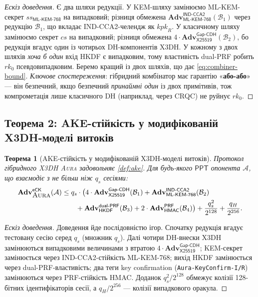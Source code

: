 \documentclass[11pt,a4paper]{article}
\newtheorem{theorem}{Теорема}[section]
\theoremstyle{definition}
\newcommand{\ppt}{\ensuremath{\mathsf{PPT}}}
\newcommand{\adv}{\ensuremath{\mathbf{Adv}}}
\newcommand{\advA}{\ensuremath{\mathcal{A}}}
\newcommand{\advB}{\ensuremath{\mathcal{B}}}
\newcommand{\HKDF}{\textsf{HKDF}}
\newcommand{\HMAC}{\textsf{HMAC}}
\renewcommand{\DH}{\textsf{X25519}}
\newcommand{\KEM}{\textsf{ML-KEM-768}}
\newcommand{\GapCDH}{\textsf{Gap-CDH}}
\newcommand{\INDCCA}{\textsf{IND-CCA2}}
\newcommand{\PRF}{\textsf{PRF}}
\newcommand{\dualPRF}{\textsf{dual-PRF}}
\newcommand{\eCK}{\textsf{eCK}}
\newcommand{\rk}{\ensuremath{\mathit{rk}}}
\newcommand{\Aura}{\mbox{\normalfont\scshape Aura}}
\begin{document}
\begin{proof}[Ескіз доведення]
Є два шляхи редукції. У KEM-шляху замінюємо ML-KEM-секрет
$\mathit{ss}_{\KEM}$ на випадковий; різниця обмежена
$\adv^{\INDCCA}_{\KEM}(\advB_1)$ через редукцію $\advB_1$, що вкладає
\INDCCA{}-челендж як $\mathit{kpk}_R$. У класичному шляху замінюємо
секрет $\mathit{cs}$ на випадковий; різниця обмежена
$4\cdot\adv^{\GapCDH}_{\DH}(\advB_2)$, бо редукція вгадує один із
чотирьох DH-компонентів X3DH. У кожному з двох шляхів \emph{хоча б
один} вхід HKDF є випадковим, тому властивість \dualPRF{} робить
$\rk_0$ псевдовипадковим. Беремо кращий із двох шляхів, що дає
\cref{eq:combiner-bound}. \emph{Ключове спостереження}: гібридний
комбінатор має гарантію «\textbf{або-або}» — він безпечний, якщо
безпечний \emph{принаймні один} із двох примітивів, тож компрометація
лише класичного DH (наприклад, через CRQC) не руйнує $\rk_0$.
\end{proof}

\subsection{Теорема 2: AKE-стійкість у модифікованій X3DH-моделі витоків}\label{sec:thm2}

\begin{theorem}[AKE-стійкість у модифікованій X3DH-моделі витоків]\label{thm:ake}
Протокол гібридного X3DH \Aura{} задовольняє \cref{def:ake}. Для будь-якого
\ppt{} опонента $\advA$, що взаємодіє з не більш ніж $q_s$ сесіями:
\begin{align}
  \adv^{\eCK}_{\Aura}(\advA)
  &\le
  q_s \cdot \big(
    4 \cdot \adv^{\GapCDH}_{\DH}(\advB_1)
    + \adv^{\INDCCA}_{\KEM}(\advB_2) \notag\\
  &\qquad
    + \adv^{\dualPRF}_{\HKDF}(\advB_3)
    + 2 \cdot \adv^{\PRF}_{\HMAC}(\advB_4)\big)
    + \frac{q_s^2}{2^{128}} + \frac{q_H}{2^{256}} .
  \label{eq:ake-bound}
\end{align}
\end{theorem}

\begin{proof}[Ескіз доведення]
Доведення йде послідовністю ігор. Спочатку редукція вгадує тестовану
сесію серед $q_s$ (множник $q_s$). Далі чотири DH-внески X3DH
замінюються випадковими величинами з втратою
$4\cdot\adv^{\GapCDH}_{\DH}$; KEM-секрет замінюється через
\INDCCA{}-стійкість \KEM{}; вихід HKDF замінюється через
\dualPRF{}-властивість; два теги key confirmation
(\texttt{Aura-KeyConfirm-I/R}) замінюються через \PRF{}-стійкість
\HMAC{}. Доданок $q_s^2/2^{128}$ обмежує колізії 128-бітних
ідентифікаторів сесії, а $q_H/2^{256}$ — колізії випадкового
оракула.
\end{proof}
\end{document}
